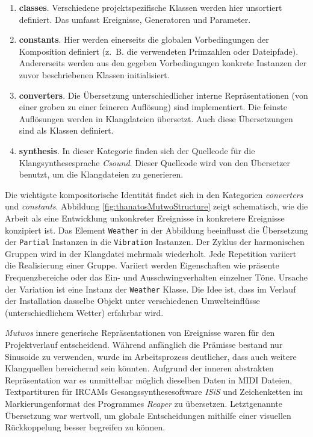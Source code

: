 \documentclass[12pt,a4paper,ngerman]{article}
\begin{document}
\begin{enumerate}
    \item{%
        \textbf{classes}.
        Verschiedene projektspezifische Klassen werden hier unsortiert definiert.
        Das umfasst Ereignisse, Generatoren und Parameter.
    }

    \item{%
        \textbf{constants}.
        Hier werden einerseits die globalen Vorbedingungen der Komposition definiert (z.~B. die verwendeten Primzahlen oder Dateipfade).
        Andererseits werden aus den gegeben Vorbedingungen konkrete Instanzen der zuvor beschriebenen Klassen initialisiert.
    }

    \item{%
        \textbf{converters}.
        Die Übersetzung unterschiedlicher interne Repräsentationen (von einer groben zu einer feineren Auflösung) sind implementiert.
        Die feinste Auflösungen werden in Klangdateien übersetzt.
        Auch diese Übersetzungen sind als Klassen definiert.
    }

    \item{%
        \textbf{synthesis}.
        In dieser Kategorie finden sich der Quellcode für die Klangsynthesesprache \emph{Csound}.
        Dieser Quellcode wird von den Übersetzer benutzt, um die Klangdateien zu generieren.
    }
\end{enumerate}

Die wichtigste kompositorische Identität findet sich in den Kategorien \emph{converters} und \emph{constants}.
Abbildung \ref{fig:thanatosMutwoStructure} zeigt schematisch, wie die Arbeit als eine Entwicklung unkonkreter Ereignisse in konkretere Ereignisse konzipiert ist.
Das Element \texttt{Weather} in der Abbildung beeinflusst die Übersetzung der \texttt{Partial} Instanzen in die \texttt{Vibration} Instanzen.
Der Zyklus der harmonischen Gruppen wird in der Klangdatei mehrmals wiederholt.
Jede Repetition variiert die Realisierung einer Gruppe.
Variiert werden Eigenschaften wie präsente Frequenzbereiche oder das Ein- und Ausschwingverhalten einzelner Töne.
Ursache der Variation ist eine Instanz der \texttt{Weather} Klasse.
Die Idee ist, dass im Verlauf der Installation dasselbe Objekt unter verschiedenen Umwelteinflüsse (unterschiedlichem Wetter) erfahrbar wird.

\bigskip

\emph{Mutwos} innere generische Repräsentationen von Ereignisse waren für den Projektverlauf entscheidend.
Während anfänglich die Prämisse bestand nur Sinusoide zu verwenden, wurde im Arbeitsprozess deutlicher, dass auch weitere Klangquellen bereichernd sein könnten.
Aufgrund der inneren abstrakten Repräsentation war es unmittelbar möglich dieselben Daten in MIDI Dateien, Textpartituren für IRCAMs Gesangssynthesesoftware \emph{ISiS} und Zeichenketten im Markierungenformat des Programmes \emph{Reaper} zu übersetzen.
Letztgenannte Übersetzung war wertvoll, um globale Entscheidungen mithilfe einer visuellen Rückkoppelung besser begreifen zu können.
\end{document}
